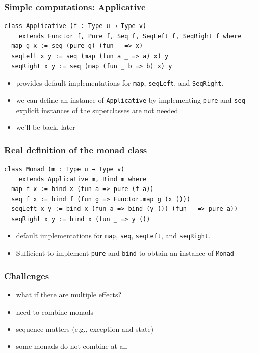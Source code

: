 \documentclass{beamer}
\begin{document}
\begin{frame}[fragile]
  \frametitle{Simple computations: Applicative}
\begin{lstlisting}
class Applicative (f : Type u → Type v)
    extends Functor f, Pure f, Seq f, SeqLeft f, SeqRight f where
  map g x := seq (pure g) (fun _ => x)
  seqLeft x y := seq (map (fun a _ => a) x) y
  seqRight x y := seq (map (fun _ b => b) x) y
\end{lstlisting}
  \begin{itemize}
  \item provides default implementations for \lstinline{map},
    \lstinline{seqLeft}, and \lstinline{SeqRight}.
  \item we can define an instance of \lstinline{Applicative} by implementing
    \lstinline{pure} and \lstinline{seq} --- explicit instances of the
    superclasses are not needed
  \item we'll be back, later
  \end{itemize}
\end{frame}

\begin{frame}[fragile]
  \frametitle{Real definition of the monad class}
\begin{lstlisting}
class Monad (m : Type u → Type v)
    extends Applicative m, Bind m where
  map f x := bind x (fun a => pure (f a))
  seq f x := bind f (fun g => Functor.map g (x ()))
  seqLeft x y := bind x (fun a => bind (y ()) (fun _ => pure a))
  seqRight x y := bind x (fun _ => y ())
\end{lstlisting}
  \begin{itemize}
  \item default implementations for \lstinline{map}, \lstinline{seq},
    \lstinline{seqLeft}, and \lstinline{seqRight}.
  \item Sufficient to implement \lstinline{pure} and \lstinline{bind} to obtain
    an instance of \lstinline{Monad}
  \end{itemize}
\end{frame}


\begin{frame}
  \frametitle{Challenges}
  \begin{itemize}
  \item what if there are multiple effects?
  \item need to combine monads
  \item sequence matters (e.g., exception and state)
  \item some monads do not combine at all
  \end{itemize}
  
\end{frame}
\end{document}
